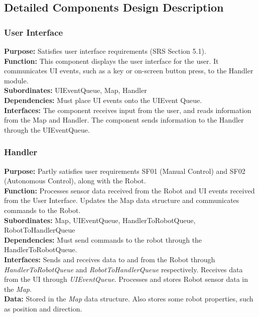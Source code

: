 \documentclass[12pt,a4paper]{article}
\begin{document}
\subsection{Detailed Components Design Description}

\subsubsection{User Interface}
	\textbf{Purpose:} Satisfies user interface requirements (SRS Section 5.1).\\
	\textbf{Function:} This component displays the user interface for the user. It communicates UI events, such as a key or on-screen button press, to the Handler module.\\
	\textbf{Subordinates:} UIEventQueue, Map, Handler\\
	\textbf{Dependencies:} Must place UI events onto the UIEvent Queue.\\
	\textbf{Interfaces:} The component receives input from the user, and reads information from the Map and Handler. The component sends information to the Handler through the UIEventQueue.\\
    
\subsubsection{Handler}
	\textbf{Purpose:} Partly satisfies user requirements SF01 (Manual Control) and SF02 (Autonomous Control), along with the Robot.\\
	\textbf{Function:} Processes sensor data received from the Robot and UI events received from the User Interface. Updates the Map data structure and communicates commands to the Robot.\\
	\textbf{Subordinates:} Map, UIEventQueue, HandlerToRobotQueue, RobotToHandlerQueue\\
	\textbf{Dependencies:} Must send commands to the robot through the HandlerToRobotQueue.\\
	\textbf{Interfaces:} Sends and receives data to and from the Robot through \textit{HandlerToRobotQueue} and \textit{RobotToHandlerQueue} respectively. Receives data from the UI through \textit{UIEventQueue}. Processes and stores Robot sensor data in the \textit{Map}.\\
    \textbf{Data:} Stored in the \textit{Map} data structure. Also stores some robot properties, such as position and direction.\\
\end{document}
